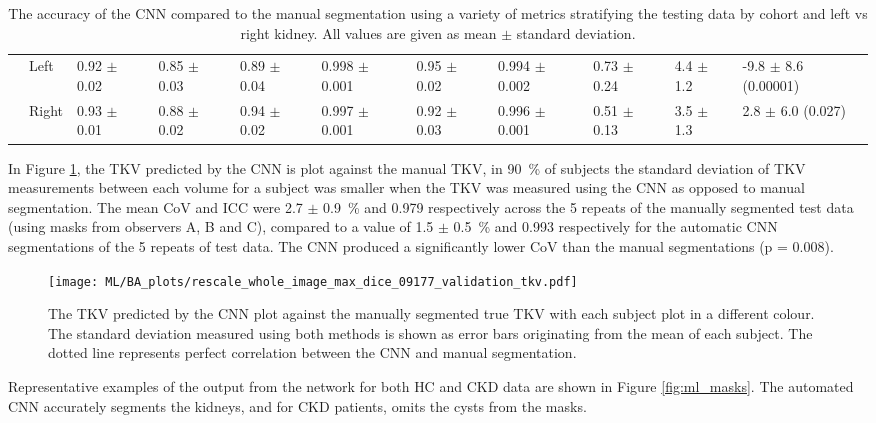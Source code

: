 \begin{landscape}
\begin{table}[H]
\begin{adjustbox}{width=\hsize, center}
\begin{tabularx}{1.3\hsize}{XX||X|X|X|X|X|X|X|X|X}
		& Left   & 0.92 $\pm$ 0.02   & 0.85 $\pm$ 0.03     & 0.89 $\pm$ 0.04   & 0.998 $\pm$ 0.001   & 0.95 $\pm$ 0.02   & 0.994 $\pm$ 0.002   & 0.73 $\pm$ 0.24                  & 4.4 $\pm$ 1.2                                 & -9.8 $\pm$ 8.6   (0.00001) \\ \cline{2-11} 
		& Right  & 0.93 $\pm$   0.01 & 0.88 $\pm$   0.02   & 0.94 $\pm$   0.02 & 0.997   $\pm$ 0.001 & 0.92 $\pm$   0.03 & 0.996   $\pm$ 0.001 & 0.51 $\pm$   0.13                & 3.5 $\pm$   1.3                               & 2.8 $\pm$   6.0 (0.027)   
	\end{tabularx}
	\end{adjustbox}
	\caption{The accuracy of the \ac{CNN} compared to the manual segmentation using a variety of metrics stratifying the testing data by cohort and left vs right kidney. All values are given as mean $\pm$ standard deviation. }
	\label{tab:ml_testing_metrics}
\end{table}
\end{landscape}

In Figure \ref{fig:ml_testing_corr}, the \ac{TKV} predicted by the CNN is plot against the manual \ac{TKV}, in 90~\% of subjects the standard deviation of \ac{TKV} measurements between each volume for a subject was smaller when the \ac{TKV} was measured using the \ac{CNN} as opposed to manual segmentation. The mean \ac{CoV} and \ac{ICC} were 2.7 $\pm$ 0.9~\% and 0.979 respectively across the 5 repeats of the manually segmented test data (using masks from observers A, B and C), compared to a value of 1.5 $\pm$ 0.5~\% and 0.993 respectively for the automatic \ac{CNN} segmentations of the 5 repeats of test data. The \ac{CNN} produced a significantly lower \ac{CoV} than the manual segmentations (p = 0.008).

\begin{figure}[H]
	\centering
	\texttt{[image: ML/BA\_plots/rescale\_whole\_image\_max\_dice\_09177\_validation\_tkv.pdf]}
	\caption{The \ac{TKV} predicted by the \ac{CNN} plot against the manually segmented true \ac{TKV} with each subject plot in a different colour. The standard deviation measured using both methods is shown as error bars originating from the mean of each subject. The dotted line represents perfect correlation between the \ac{CNN} and manual segmentation.}
	\label{fig:ml_testing_corr}	
\end{figure}

Representative examples of the output from the network for both \ac{HC} and \ac{CKD} data are shown in Figure \ref{fig:ml_masks}. The automated \ac{CNN} accurately segments the kidneys, and for \ac{CKD} patients, omits the cysts from the masks. 

